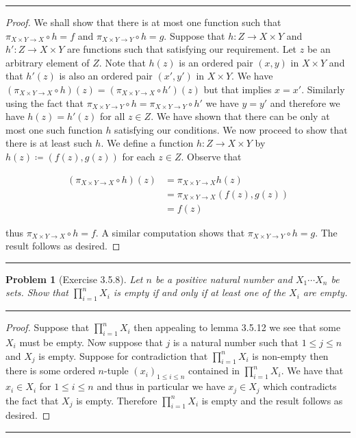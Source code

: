 \documentclass{article}
\newcommand{\lined}{\noindent\rule{\textwidth}{1pt}}
\newtheorem*{problem}{Problem}
\begin{document}
	\lined
	\begin{proof}
		We shall show that there is at most one function such that $\pi_{X \times Y \rightarrow X} \circ h = f$ and  $\pi_{X \times Y \rightarrow Y} \circ h = g$. Suppose that $h:Z \rightarrow X \times Y$ and $h':Z \rightarrow X \times Y$ are functions such that satisfying our requirement. Let $z$ be an arbitrary element of $Z$. Note that $h(z)$ is an ordered pair $(x,y)$ in $X \times Y$ and that $h'(z)$ is also an ordered pair $(x',y')$ in $X \times Y$. We have $(\pi_{X \times Y \rightarrow X} \circ h)(z) = (\pi_{X \times Y \rightarrow X} \circ h')(z)$ but that implies $x = x'$. Similarly using the fact that $\pi_{X \times Y \rightarrow Y} \circ h = 
		\pi_{X \times Y \rightarrow Y} \circ h'$ we have $y = y'$ and therefore we have $h(z) = h'(z)$ for all $z \in Z$. We have shown that there can be only at most one such function $h$ satisfying our conditions. We now proceed to show that there is at least such $h$. We define a function $h:Z \rightarrow X \times Y$ by $h(z) \coloneqq (f(z),g(z))$ for each $z \in Z$. Observe that
		
		\begin{equation*}
			\begin{split}
					(\pi_{X \times Y \rightarrow X} \circ h)(z) & = \pi_{X \times Y \rightarrow X}h(z) \\
					& = \pi_{X \times Y \rightarrow X}(f(z),g(z)) \\
					& = f(z)
			\end{split}
		\end{equation*}
	
		thus $\pi_{X \times Y \rightarrow X} \circ h = f$. A similar computation shows that $\pi_{X \times Y \rightarrow Y} \circ h = g$. 
		The result follows as desired.
		
		
	\end{proof}
	\lined
	
	\newpage
	
	\begin{problem}[Exercise 3.5.8]
		Let $n$ be a positive natural number and $X_1 \cdots X_n$ be sets. Show that $\prod_{i=1}^{n}X_i$ is empty
		if and only if at least one of the $X_i$ are empty.
	\end{problem}

	\lined
	\begin{proof}
		Suppose that $\prod_{i=1}^{n}X_i$ then appealing to lemma 3.5.12 we see that some $X_i$ must be empty. Now
		suppose that $j$ is a natural number such that $1 \leq j \leq n$ and $X_j$ is empty. Suppose for contradiction that
		$\prod_{i=1}^{n}X_i$ is non-empty then there is some ordered $n$-tuple $(x_i)_{1 \leq i \leq n}$ contained in $\prod_{i=1}^{n}X_i$.
		We have that $x_i \in X_i$ for $1 \leq i \leq n$ and thus in particular we have $x_j \in X_j$ which contradicts the fact that 
		$X_j$ is empty. Therefore $\prod_{i=1}^{n}X_i$ is empty and the result follows as desired.
	\end{proof}
	\lined
	
\end{document}

